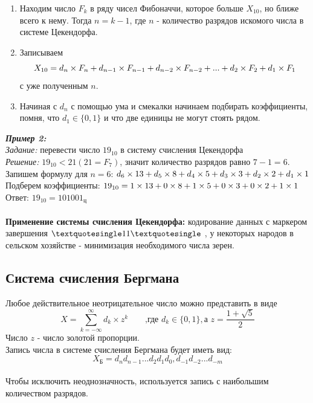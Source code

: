 \begin{enumerate}
\item Находим число $F_{k}$ в ряду чисел Фибоначчи, которое больше $X_{10}$, но ближе всего к нему. Тогда $n = k - 1$, где $n$ - количество разрядов искомого числа в системе Цекендорфа.
\item Записываем $$ X_{10} = d_{n}\times F_{n} + d_{n-1}\times F_{n-1} + d_{n-2}\hm\times F_{n-2}\hm + ...\hm + d_{2}\times F_{2} + d_{1}\hm\times F_{1}$$ с уже полученным $n$.
\item Начиная с $d_{n}$ с помощью ума и смекалки начинаем подбирать коэффициенты, помня, что $d_{1} \in \{0,1\}$ и что две единицы не могут стоять рядом.
\end{enumerate}

\emph{\textbf{Пример 2:}}
\\\emph{Задание:} перевести число $19_{10}$ в систему счисления Цекендорфа
\\\emph{Решение:} $19_{10} < 21 (21 = F_{7})$, значит количество разрядов равно $7 - 1 = 6$.
\\Запишем формулу для $n = 6$: $d_{6}\times 13 + d_{5}\times 8 + d_{4}\hm\times 5 + d_{3}\hm\times 3 + d_{2}\hm\times 2\hm + d_{1}\hm\times 1$
\\Подберем коэффициенты: $19_{10} = 1\times 13 + 0\times 8 + 1\hm\times 5 + 0\hm\times 3 + 0\hm\times 2\hm + 1\hm\times 1$
\\Ответ:  $19_{10} = 101001_{\mbox{ц}}$
\\
\\\textbf{Применение системы счисления Цекендорфа:} кодирование данных с маркером завершения $ \textquotesingle 11\textquotesingle $ , у некоторых народов в сельском хозяйстве - минимизация необходимого числа зерен.

\subsection{Система счисления Бергмана}
Любое действительное неотрицательное число можно представить в виде
$$ X = \sum^{\infty}_{k = -\infty} d_{k}\times z^{k} \qquad \mbox{,где  } d_{k} \in \{0,1\},\mbox{а } z = \frac{1+\sqrt{5}}{2}$$
Число $z$ - число золотой пропорции.
\\Запись числа в системе счисления Бергмана будет иметь вид: $$X_{\mbox{Б}} = d_{n}d_{n-1}...d_{2}d_{1}d_{0},d_{-1}d_{-2}...d_{-m} $$
\\Чтобы исключить неоднозначность, используется запись с наибольшим количеством разрядов.
